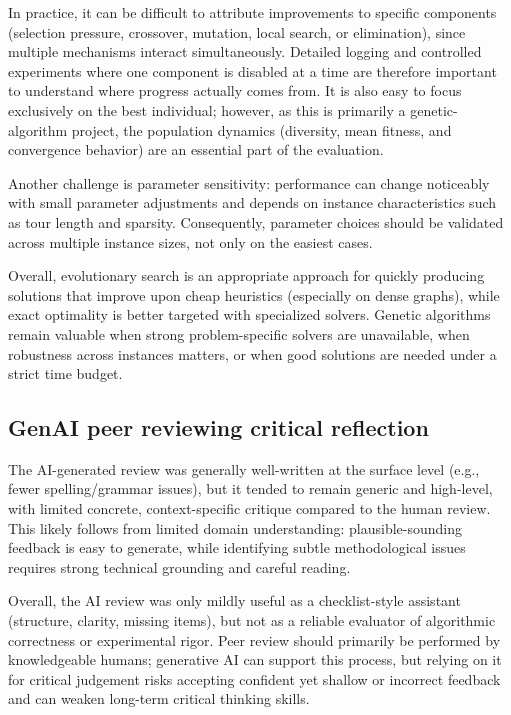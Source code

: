 \documentclass[a4paper,10pt]{article}
\begin{document}
In practice, it can be difficult to attribute improvements to specific components (selection pressure, crossover,
mutation, local search, or elimination), since multiple mechanisms interact simultaneously. Detailed logging and
controlled experiments where one component is disabled at a time are therefore important to understand where
progress actually comes from. It is also easy to focus exclusively on the best individual; however, as this is
primarily a genetic-algorithm project, the population dynamics (diversity, mean fitness, and convergence
behavior) are an essential part of the evaluation.

Another challenge is parameter sensitivity: performance can change noticeably with small parameter adjustments
and depends on instance characteristics such as tour length and sparsity. Consequently, parameter choices should
be validated across multiple instance sizes, not only on the easiest cases.

Overall, evolutionary search is an appropriate approach for quickly producing solutions that improve upon cheap
heuristics (especially on dense graphs), while exact optimality is better targeted with specialized solvers.
Genetic algorithms remain valuable when strong problem-specific solvers are unavailable, when robustness across
instances matters, or when good solutions are needed under a strict time budget.

\subsection{GenAI peer reviewing critical reflection} 

The AI-generated review was generally well-written at the surface level (e.g., fewer spelling/grammar issues),
but it tended to remain generic and high-level, with limited concrete, context-specific critique compared to the
human review. This likely follows from limited domain understanding: plausible-sounding feedback is easy to
generate, while identifying subtle methodological issues requires strong technical grounding and careful reading.

Overall, the AI review was only mildly useful as a checklist-style assistant (structure, clarity, missing items),
but not as a reliable evaluator of algorithmic correctness or experimental rigor. Peer review should primarily be
performed by knowledgeable humans; generative AI can support this process, but relying on it for critical
judgement risks accepting confident yet shallow or incorrect feedback and can weaken long-term critical thinking
skills.
\end{document}
